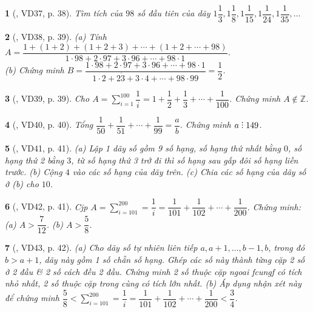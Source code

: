 \documentclass{article}
\newtheorem{baitoan}{}
\DeclareRobustCommand{\divby}{%
	\mathrel{\vbox{\baselineskip.65ex\lineskiplimit0pt\hbox{.}\hbox{.}\hbox{.}}}%
}
\begin{document}
\begin{baitoan}[\cite{Binh_Toan_6_tap_2}, VD37, p. 38]
	Tìm tích của $98$ số đầu tiên của dãy $1\dfrac{1}{3},1\dfrac{1}{8},1\dfrac{1}{15},1\dfrac{1}{24},1\dfrac{1}{35},\ldots$
\end{baitoan}

\begin{baitoan}[\cite{Binh_Toan_6_tap_2}, VD38, p. 39]
	(a) Tính $A = \dfrac{1 + (1 + 2) + (1 + 2 + 3) + \cdots + (1 + 2 + \cdots + 98)}{1\cdot98 + 2\cdot97 + 3\cdot96 + \cdots + 98\cdot1}$.\\(b) Chứng minh $B = \dfrac{1\cdot98 + 2\cdot97 + 3\cdot96 + \cdots + 98\cdot1}{1\cdot2 + 2\dot3 + 3\cdot4 + \cdots + 98\cdot99} = \dfrac{1}{2}$.
\end{baitoan}

\begin{baitoan}[\cite{Binh_Toan_6_tap_2}, VD39, p. 39]
	Cho $A = \sum_{i=1}^{100} \dfrac{1}{i} = 1 + \dfrac{1}{2} + \dfrac{1}{3} + \cdots + \dfrac{1}{100}$. Chứng minh $A\notin\mathbb{Z}$.
\end{baitoan}

\begin{baitoan}[\cite{Binh_Toan_6_tap_2}, VD40, p. 40]
	Tổng $\dfrac{1}{50} + \dfrac{1}{51} + \cdots + \dfrac{1}{99} = \dfrac{a}{b}$. Chứng minh $a\divby149$.
\end{baitoan}

\begin{baitoan}[\cite{Binh_Toan_6_tap_2}, VD41, p. 41]
	(a) Lập 1 dãy số gồm 9 số hạng, số hạng thứ nhất bằng $0$, số hạng thứ 2 bằng $3$, từ số hạng thứ 3 trở đi thì số hạng sau gấp đôi số hạng liền trước. (b) Cộng $4$ vào các số hạng của dãy trên. (c) Chia các số hạng của dãy số ở (b) cho $10$.
\end{baitoan}

\begin{baitoan}[\cite{Binh_Toan_6_tap_2}, VD42, p. 41]
	Cjp $A = \sum_{i=101}^{200} = \dfrac{1}{i} = \dfrac{1}{101} + \dfrac{1}{102} + \cdots + \dfrac{1}{200}$. Chứng minh: (a) $A > \dfrac{7}{12}$. (b) $A > \dfrac{5}{8}$.
\end{baitoan}

\begin{baitoan}[\cite{Binh_Toan_6_tap_2}, VD43, p. 42]
	(a) Cho dãy số tự nhiên liên tiếp $a,a + 1,\ldots,b - 1,b$, trong đó $b > a + 1$, dãy này gồm 1 số chẵn số hạng. Ghép các số này thành từng cặp 2 số ở 2 đầu \& 2 số cách đều 2 đầu. Chứng minh 2 số thuộc cặp ngoai fcungf có tích nhỏ nhất, 2 số thuộc cặp trong cùng có tích lớn nhất. (b) Áp dụng nhận xét này để chứng minh $\dfrac{5}{8} < \sum_{i=101}^{200} = \dfrac{1}{i} = \dfrac{1}{101} + \dfrac{1}{102} + \cdots + \dfrac{1}{200} < \dfrac{3}{4}$.
\end{baitoan}
\end{document}
